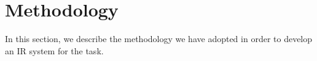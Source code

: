 \section{Methodology}
\label{sec:methodology}

In this section, we describe the methodology we have adopted in order to develop an \ac{IR} system for the task.







